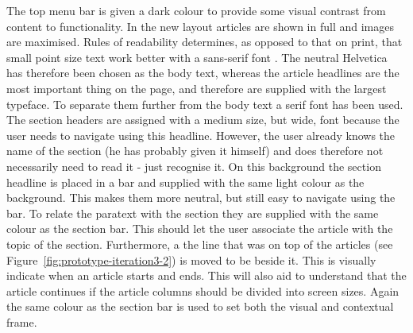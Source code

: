 The top menu bar is given a dark colour to provide some visual contrast from content to functionality. In the new layout articles are shown in full and images are maximised. Rules of readability determines, as opposed to that on print, that small point size text work better with a sans-serif font \cite{Tidwell}. The neutral Helvetica has therefore been chosen as the body text, whereas the article headlines are the most important thing on the page, and therefore are supplied with the largest typeface. To separate them further from the body text a serif font has been used. The section headers are assigned with a medium size, but wide, font because the user needs to navigate using this headline. However, the user already knows the name of the section (he has probably given it himself) and does therefore not necessarily need to read it - just recognise it. On this background the section headline is placed in a bar and supplied with the same light colour as the background. This makes them more neutral, but still easy to navigate using the bar. To relate the paratext with the section they are supplied with the same colour as the section bar. This should let the user associate the article with the topic of the section. Furthermore, a the line that was on top of the articles (see Figure~\ref{fig:prototype-iteration3-2}) is moved to be beside it. This is visually indicate when an article starts and ends. This will also aid to understand that the article continues if the article columns should be divided into screen sizes. Again the same colour as the section bar is used to set both the visual and contextual frame.

